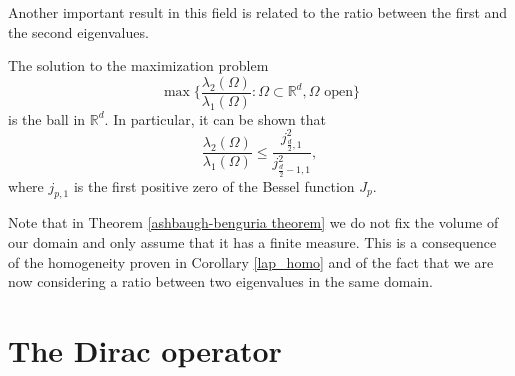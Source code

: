 Another important result in this field is related to the ratio between the first and the second eigenvalues.
\begin{theorem}\label{ashbaugh-benguria theorem}
    The solution to the maximization problem
    \[
    \max \Big\{\frac{\lambda_2(\Omega)}{\lambda_1(\Omega)}: \Omega \subset \mathbb{R}^d, \Omega \text{ open} \Big\}
    \]
    is the ball in \(\mathbb{R}^d\). In particular, it can be shown that
    \[
    \frac{\lambda_2(\Omega)}{\lambda_1(\Omega)}  \leq \frac{j_{\frac{d}{2},1}^2}{j_{\frac{d}{2}-1,1}^2},
    \]
    where \(j_{p,1}\) is the first positive zero of the Bessel function \(J_p\).
\end{theorem}

\begin{remark}
    Note that in Theorem \ref{ashbaugh-benguria theorem} we do not fix the volume of our domain and only assume that it has a finite measure. This is a consequence of the homogeneity proven in Corollary \eqref{lap_homo} and of the fact that we are now considering a ratio between two eigenvalues in the same domain.
\end{remark}


\section{The Dirac operator}

